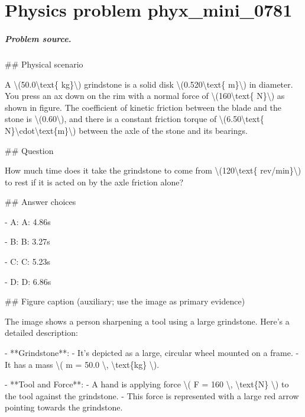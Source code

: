 
\chapter{Physics problem phyx\_mini\_0781}
\label{ch:PhyXMiniProblems_problem_phyx_mini_0781}

\paragraph{Problem source.}
\#\# Physical scenario

A \textbackslash{}(50.0\textbackslash{}text\{ kg\}\textbackslash{}) grindstone is a solid disk \textbackslash{}(0.520\textbackslash{}text\{ m\}\textbackslash{}) in diameter. You press an ax down on the rim with a normal force of \textbackslash{}(160\textbackslash{}text\{ N\}\textbackslash{}) as shown in figure. The coefficient of kinetic friction between the blade and the stone is \textbackslash{}(0.60\textbackslash{}), and there is a constant friction torque of \textbackslash{}(6.50\textbackslash{}text\{ N\}\textbackslash{}cdot\textbackslash{}text\{m\}\textbackslash{}) between the axle of the stone and its bearings.

\#\# Question

How much time does it take the grindstone to come from \textbackslash{}(120\textbackslash{}text\{ rev/min\}\textbackslash{}) to rest if it is acted on by the axle friction alone?

\#\# Answer choices

- A: A: 4.86s

- B: B: 3.27s

- C: C: 5.23s

- D: D: 6.86s

\#\# Figure caption (auxiliary; use the image as primary evidence)

The image shows a person sharpening a tool using a large grindstone. Here's a detailed description:

- **Grindstone**: 
  - It's depicted as a large, circular wheel mounted on a frame.
  - It has a mass \textbackslash{}( m = 50.0 \textbackslash{}, \textbackslash{}text\{kg\} \textbackslash{}).

- **Tool and Force**:
  - A hand is applying force \textbackslash{}( F = 160 \textbackslash{}, \textbackslash{}text\{N\} \textbackslash{}) to the tool against the grindstone.
  - This force is represented with a large red arrow pointing towards the grindstone.


